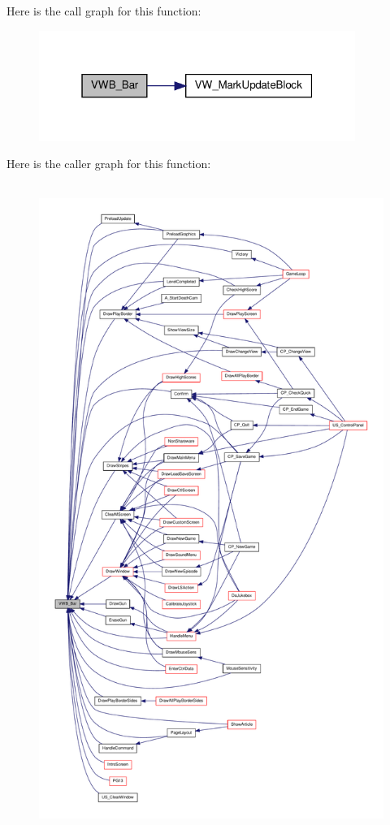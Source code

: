 Here is the call graph for this function:
\nopagebreak
\begin{figure}[H]
\begin{center}
\leavevmode
\includegraphics[width=292pt]{ID__VH_8H_a5496b8df6f9a9de1b3f788ce6951c865_cgraph}
\end{center}
\end{figure}




Here is the caller graph for this function:
\nopagebreak
\begin{figure}[H]
\begin{center}
\leavevmode
\includegraphics[height=600pt]{ID__VH_8H_a5496b8df6f9a9de1b3f788ce6951c865_icgraph}
\end{center}
\end{figure}


